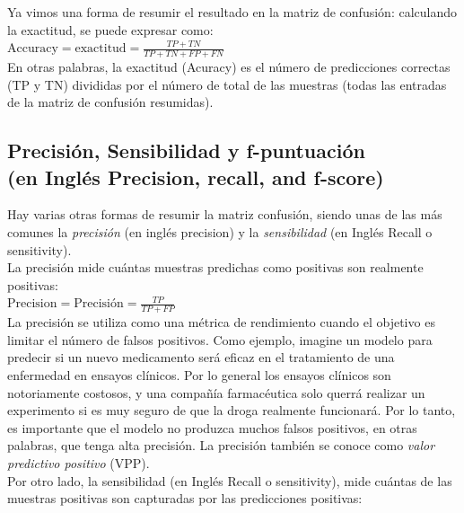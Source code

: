{ Ya vimos una forma de resumir el resultado en  la matriz de confusión: calculando la exactitud,  se puede expresar como:\\

$ \text{Accuracy} = \text{exactitud} = \frac{TP+TN}{TP + TN + FP + FN} $\\


En otras palabras, la exactitud (Acuracy) es el número de predicciones correctas (TP y TN) divididas
por el número de total de las muestras (todas las entradas de la matriz de confusión resumidas).

\subsection{Precisión, Sensibilidad y f-puntuación\\ (en Inglés Precision, recall, and f-score)}
	
 
 Hay varias otras formas de resumir la  matriz confusión, siendo unas de las más comunes la \emph{precisión} (en inglés precision)  y  la \emph{sensibilidad} (en Inglés Recall o sensitivity).\\  
 
 La  precisión  mide cuántas muestras predichas como positivas son realmente positivas:\\

$\text{Precision} =  \text{Precisión} = \frac{TP}{TP +  FP} $  \\  %

          
La  precisión se utiliza como una métrica de rendimiento cuando el objetivo es limitar el número de falsos positivos.   Como ejemplo, imagine un modelo para predecir si un nuevo medicamento será eficaz en el tratamiento de una enfermedad en ensayos clínicos.   Por lo general los ensayos clínicos son notoriamente  costosos, y una compañía farmacéutica   solo querrá realizar un experimento si es  muy seguro de que la droga
  realmente funcionará.  Por lo tanto, es importante que el modelo no produzca muchos falsos positivos, en otras palabras, que tenga  alta precisión.   La precisión  también se conoce como    \emph{ valor predictivo positivo} (VPP).\\
 
Por otro lado,  la sensibilidad (en Inglés Recall o sensitivity),  mide cuántas de las muestras positivas son capturadas  por las predicciones positivas:\\

}
